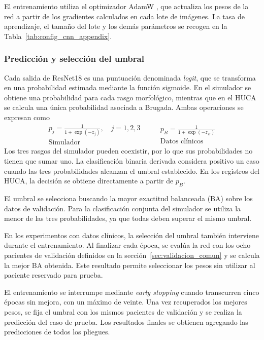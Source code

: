 El entrenamiento utiliza el optimizador AdamW \cite{loshchilov2019}, que actualiza los pesos de la red a partir de los gradientes calculados en cada lote de imágenes. La tasa de aprendizaje, el tamaño del lote y los demás parámetros se recogen en la Tabla~\ref{tab:config_cnn_appendix}.

\subsubsection{Predicción y selección del umbral}
\label{sec:umbral_cnn}

Cada salida de ResNet18 es una puntuación denominada \textit{logit}, que se transforma en una probabilidad estimada mediante la función sigmoide. En el simulador se obtiene una probabilidad para cada rasgo morfológico, mientras que en el HUCA se calcula una única probabilidad asociada a Brugada. Ambas operaciones se expresan como
\begin{equation}
  \begin{gathered}
    p_j = \frac{1}{1+\exp(-z_j)},\quad j=1,2,3\\
    \text{Simulador}
  \end{gathered}
  \qquad
  \begin{gathered}
    p_B = \frac{1}{1+\exp(-z_B)}\\
    \text{Datos clínicos}
  \end{gathered}
  \label{eq:probabilidades_cnn}
\end{equation}
Los tres rasgos del simulador pueden coexistir, por lo que sus probabilidades no tienen que sumar uno. La clasificación binaria derivada considera positivo un caso cuando las tres probabilidades alcanzan el umbral establecido. En los registros del HUCA, la decisión se obtiene directamente a partir de \(p_B\).

El umbral se selecciona buscando la mayor exactitud balanceada (BA) sobre los datos de validación. Para la clasificación conjunta del simulador se utiliza la menor de las tres probabilidades, ya que todas deben superar el mismo umbral.

\begingroup
{}
En los experimentos con datos clínicos, la selección del umbral también interviene durante el entrenamiento. Al finalizar cada época, se evalúa la red con los ocho pacientes de validación definidos en la sección~\ref{sec:validacion_comun} y se calcula la mejor BA obtenida. Este resultado permite seleccionar los pesos sin utilizar al paciente reservado para prueba.

El entrenamiento se interrumpe mediante \textit{early stopping} cuando transcurren cinco épocas sin mejora, con un máximo de veinte. Una vez recuperados los mejores pesos, se fija el umbral con los mismos pacientes de validación y se realiza la predicción del caso de prueba. Los resultados finales se obtienen agregando las predicciones de todos los pliegues.
\par
\endgroup

